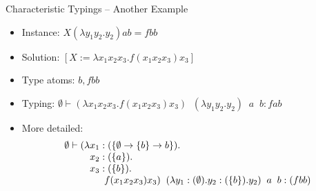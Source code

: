 \documentclass{beamer}
\renewcommand{\:}{\mbox{\,:\,}\xspace}
\begin{document}

\begin{frame}{Characteristic Typings -- Another Example}

  \begin{itemize}
  \item Instance: $X(\lambda y_1y_2.y_2)ab = fbb$
  \item Solution: $[X := \lambda x_1x_2x_3.f(x_1x_2x_3)x_3]$
  \item Type atoms: $b, fbb$
  \item Typing: $\emptyset\vdash (\lambda x_1x_2x_3.f(x_1x_2x_3)x_3)\;\;(\lambda y_1y_2.y_2)\;\;a\;\;b : fab$
    
  \item More detailed:
    \begin{displaymath}
      \begin{array}{l@{}l}
        \emptyset\vdash
        (\lambda & x_1:(\{\emptyset\to\{b\}\to b\}).\\ & 
                                                                                                   x_2:(\{a\}).\\ &
                                                                                                   x_3:(\{b\}).\\ &

         \multicolumn{1}{l}{~~~f(x_1x_2x_3)x_3)\;\;(\lambda y_1:(\emptyset).y_2:(\{b\}).y_2)\;\;a\;\;b : (fbb)}
      \end{array}
    \end{displaymath}
    
  \end{itemize}

  \end{frame}

\end{document}
